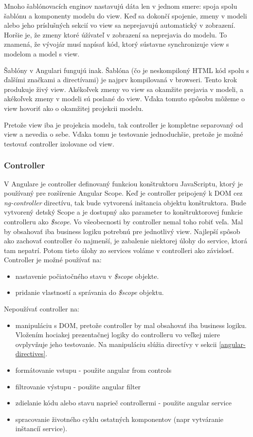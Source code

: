 Mnoho šablónovacích enginov nastavujú dáta len v jednom smere: spoja spolu šablónu a komponenty modelu do view. Keď sa dokončí spojenie, zmeny v modeli alebo jeho príslušných sekcií vo view sa neprejavujú automatický v zobrazení. Horšie je, že zmeny ktoré úžívateľ v zobrazení sa neprejavia do modelu. To znamená, že vývojár musí napísať kód, ktorý sústavne synchronizuje view s modelom a model s view.

Šablóny v Angulari fungujú inak. Šablóna (čo je neskompiloný HTML kód spolu s ďalšími značkami a directívami) je najprv kompilovaná v browseri. Tento krok produkuje živý view. Akékoľvek zmeny vo view sa okamžite prejavia v modeli, a akékoľvek zmeny v modeli sú poslané do view. Vďaka tomuto spôsobu môžeme o view hovoriť ako o okamžitej projekcii modelu.

Pretože view iba je projekcia modelu, tak controller je kompletne separovaný od view a nevedia o sebe. Vďaka tomu je testovanie jednoduchšie, pretože je možné testovať controller izolovane od view.\cite{angular-docs}

\subsubsection{Controller}
V Angulare je controller definovaný funkciou konštruktoru JavaScriptu, ktorý je používaný pre rozšírenie Angular Scope.
Keď je controller pripojený k DOM cez \textit{ng-controller} directívu, tak bude vytvorená inštancia objektu konštruktora. Bude vytvorený detský Scope a je dostupný ako parameter to konštruktorovej funkcie controlleru ako \textit{\$scope}.
Vo všeobecnosti by controller nemal toho robiť veľa. Mal by obsahovať iba business logiku potrebnú pre jednotlivý view. Najlepší spôsob ako zachovať controller čo najmenší, je zabalenie niektorej úlohy do service, ktorá tam nepatrí. Potom tieto úlohy zo services voláme v controlleri ako závislosť.\cite{angular-docs}\\

Controller je možné používať na:
\begin{itemize}
\item nastavenie počiatočného stavu v \textit{\$scope} objekte.
\item pridanie vlastností a správania do \textit{\$scope} objektu.
\end{itemize}

Nepoužívať controller na:
\begin{itemize}
\item manipuláciu s DOM, pretože controller by mal obsahovať iba business logiku. Vložením hociakej prezentačnej logiky do controlleru vo veľkej miere ovplyvňuje jeho testovanie. Na manipuláciu slúžia directívy v sekcii \ref{angular-directives}.
\item formátovanie vstupu - použite angular from controls
\item filtrovanie výstupu - použite angular filter
\item zdielanie kódu alebo stavu naprieč controllermi - použite angular service
\item spracovanie životného cyklu ostatných komponentov (napr vytváranie inštancíí service).
\end{itemize}

